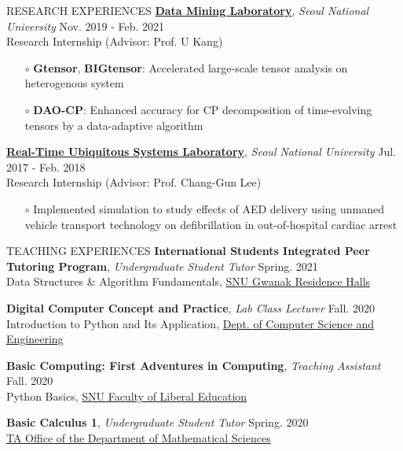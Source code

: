 \documentclass[12pt]{resume} %
\begin{document}
\begin{rSection}{RESEARCH EXPERIENCES}
\href{https://datalab.snu.ac.kr/}{\textbf{Data Mining Laboratory}}, \textit{Seoul National University} \hfill Nov. 2019 - Feb. 2021 \\
Research Internship (Advisor: Prof. U Kang)
\vspace{-1mm}
\begin{itemize}
  \item[$\circ$] \textbf{Gtensor}, \textbf{BIGtensor}: Accelerated large-scale tensor analysis on heterogenous system \vspace{-1mm}
  \item[$\circ$] \textbf{DAO-CP}: Enhanced accuracy for CP decomposition of time-evolving tensors by a data-adaptive algorithm
\end{itemize}
\href{https://rubis.snu.ac.kr/}{\textbf{Real-Time Ubiquitous Systems Laboratory}}, \textit{Seoul National University} \hfill Jul. 2017 - Feb. 2018 \\
Research Internship (Advisor: Prof. Chang-Gun Lee)
\vspace{-1mm}
\begin{itemize}
  \item[$\circ$] Implemented simulation to study effects of AED delivery using unmaned vehicle transport technology on defibrillation in out-of-hospital cardiac arrest
\end{itemize}
\end{rSection}

\begin{rSection}{TEACHING EXPERIENCES} 
{\bf International Students Integrated Peer Tutoring Program}, \textit{Undergraduate Student Tutor} \hfill Spring. 2021 \\
Data Structures \& Algorithm Fundamentals, \href{https://dorm.snu.ac.kr/}{SNU Gwanak Residence Halls}

{\bf Digital Computer Concept and Practice}, \textit{Lab Class Lecturer} \hfill Fall. 2020 \\
Introduction to Python and Its Application, \href{https://cse.snu.ac.kr/}{Dept. of Computer Science and Engineering}

{\bf Basic Computing: First Adventures in Computing}, \textit{Teaching Assistant} \hfill Fall. 2020 \\
Python Basics, \href{https://liberaledu.snu.ac.kr/}{SNU Faculty of Liberal Education}

{\bf Basic Calculus 1}, \textit{Undergraduate Student Tutor} \hfill Spring. 2020 \\
\href{http://www.math.snu.ac.kr/}{TA Office of the Department of Mathematical Sciences}
\end{rSection}
\end{document}
